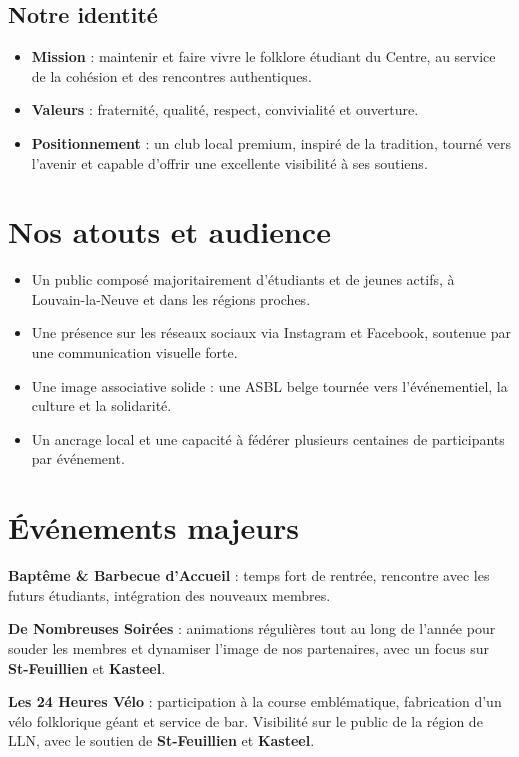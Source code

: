 \documentclass[11pt,a4paper]{scrartcl}
\begin{document}
\subsection{Notre identité}
\begin{itemize}[leftmargin=*]
    \item \textbf{Mission} : maintenir et faire vivre le folklore étudiant du Centre, au service de la cohésion et des rencontres authentiques.
    \item \textbf{Valeurs} : fraternité, qualité, respect, convivialité et ouverture.
    \item \textbf{Positionnement} : un club local premium, inspiré de la tradition, tourné vers l'avenir et capable d'offrir une excellente visibilité à ses soutiens.
\end{itemize}

\section{Nos atouts et audience}
\begin{itemize}[leftmargin=*]
    \item Un public composé majoritairement d'étudiants et de jeunes actifs, à Louvain-la-Neuve et dans les régions proches.
    \item Une présence sur les réseaux sociaux via Instagram et Facebook, soutenue par une communication visuelle forte.
    \item Une image associative solide : une ASBL belge tournée vers l'événementiel, la culture et la solidarité.
    \item Un ancrage local et une capacité à fédérer plusieurs centaines de participants par événement.
\end{itemize}

\section{Événements majeurs}
\textbf{Baptême \& Barbecue d'Accueil} : temps fort de rentrée, rencontre avec les futurs étudiants, intégration des nouveaux membres.

\textbf{De Nombreuses Soirées} : animations régulières tout au long de l'année pour souder les membres et dynamiser l'image de nos partenaires, avec un focus sur \textbf{St-Feuillien} et \textbf{Kasteel}.

\textbf{Les 24 Heures Vélo} : participation à la course emblématique, fabrication d'un vélo folklorique géant et service de bar. Visibilité sur le public de la région de LLN, avec le soutien de \textbf{St-Feuillien} et \textbf{Kasteel}.
\end{document}
